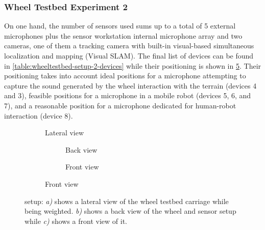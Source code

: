 \subsubsection{Wheel Testbed Experiment 2}
\label{subsec:wheel-testbed-experiment-2}

On one hand, the number of sensors used sums up to a total of 5 external
microphones plus the sensor workstation internal microphone array and two
cameras, one of them a tracking camera with built-in visual-based simultaneous
localization and mapping (Visual SLAM). The final list of devices can be found
in \cref{table:wheeltestbed-setup-2-devices} while their positioning is shown
in \cref{fig:wheeltestbed-setup-2}. Their positioning takes into account ideal
positions for a microphone attempting to capture the sound generated by the
wheel interaction with the terrain (devices 4 and 3), feasible positions for a
microphone in a mobile robot (devices 5, 6, and 7), and a reasonable position
for a microphone dedicated for human-robot interaction (device 8).


\begin{figure}
    \begin{subfigure}{.57\linewidth}
        \centering
        
        \caption{Lateral view}
        \label{fig:wheeltestbed-setup-2-lateral}
    \end{subfigure}
    \hfill
    \begin{subfigure}{.40\linewidth}
        \begin{subfigure}{\linewidth}
            \centering
            
            \caption{Back view}
            \label{fig:wheeltestbed-setup-2-back}
        \end{subfigure}
        \bigskip
        
        \begin{subfigure}{\linewidth}
            \centering
            
            \caption{Front view}
            \label{fig:wheeltestbed-setup-2-front}
        \end{subfigure}
    \end{subfigure}
    \caption[ setup]{
         setup: \emph{a)} shows a
        lateral view of the wheel testbed carriage while being weighted.
        \emph{b)} shows a back view of the wheel and sensor setup while
        \emph{c)} shows a front view of it.}
    \label{fig:wheeltestbed-setup-2}
\end{figure}

